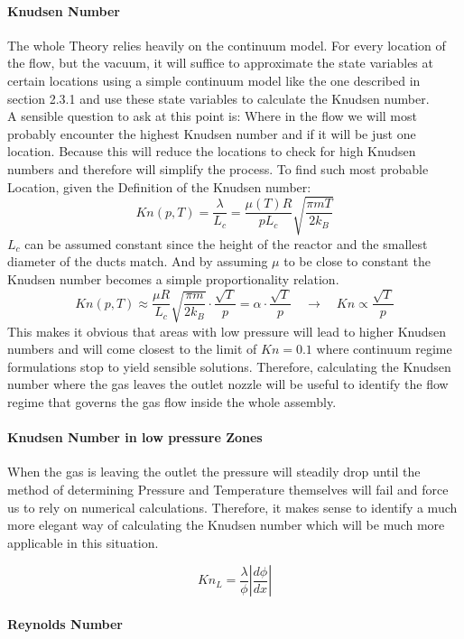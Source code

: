\paragraph{Knudsen Number}
The whole Theory relies heavily on the continuum model. For every location of the flow, but the vacuum, it will suffice to approximate the state variables at certain locations using a simple continuum model like the one described in section 2.3.1  and use these state variables to calculate the Knudsen number.\\
A sensible question to ask at this point is: Where in the flow we will most probably encounter the highest Knudsen number and if it will be just one location. Because this will reduce the locations to check for high Knudsen numbers and therefore will simplify the process. To find such most probable Location, given the Definition of the Knudsen number:
$$
Kn(p,T) = \frac{\lambda}{L_c} = \frac{\mu(T)R}{pL_c}\sqrt{\frac{\pi m T}{2k_B}}
$$
$L_c$ can be assumed constant since the height of the reactor and the smallest diameter of the ducts match. And by assuming $\mu$ to be close to constant the Knudsen number becomes a simple proportionality relation.
$$
Kn(p,T)\approx\frac{\mu R}{L_c}\sqrt{\frac{\pi m}{2k_B}}\cdot\frac{\sqrt{T}}{p}=\alpha\cdot\frac{\sqrt{T}}{p}\quad\rightarrow\quad Kn\propto \frac{\sqrt{T}}{p}
$$
This makes it obvious that areas with low pressure will lead to higher Knudsen numbers and will come closest to the limit of $Kn=0.1$ where continuum regime formulations stop to yield sensible solutions. Therefore, calculating the Knudsen number where the gas leaves the outlet nozzle will be useful to identify the flow regime that governs the gas flow inside the whole assembly.  

\paragraph{Knudsen Number in low pressure Zones}
When the gas is leaving the outlet the pressure will steadily drop until the method of determining Pressure and Temperature themselves will fail and force us to rely on numerical calculations. Therefore, it makes sense to identify a much more elegant way of calculating the Knudsen number which will be much more applicable in this situation.

$$
K n_L = \frac{\lambda}{\phi} \left| \frac{d\phi}{dx} \right|
$$

\newpage

\paragraph{Reynolds Number}

